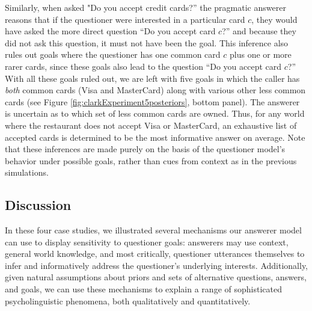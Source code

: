 \documentclass[12pt, floatsintext, jou]{apa6}
\begin{document}
Similarly, when asked "Do you accept credit cards?'' the pragmatic answerer reasons that if the questioner were interested in a particular card $c$, they would have asked the more direct question ``Do you accept card $c$?'' and because they did not ask this question, it must not have been the goal. This inference also rules out goals where the questioner has one common card $c$ plus one or more rarer cards, since these goals also lead to the question ``Do you accept card $c$?'' With all these goals ruled out, we are left with five goals in which the caller has \emph{both} common cards (Visa and MasterCard) along with various other less common cards (see Figure \ref{fig:clarkExperiment5posteriors}, bottom panel). The answerer is uncertain as to which set of less common cards are owned. Thus, for any world where the restaurant does not accept Visa or MasterCard, an exhaustive list of accepted cards is determined to be the most informative answer on average. Note that these inferences are made purely on the basis of the questioner model's behavior under possible goals, rather than cues from context as in the previous simulations.

\subsection{Discussion}

In these four case studies, we illustrated several mechanisms our answerer model can use to display sensitivity to questioner goals: answerers may use context, general world knowledge, and most critically, questioner utterances themselves to infer and informatively address the questioner's underlying interests. Additionally, given natural assumptions about priors and sets of alternative questions, answers, and goals, we can use these mechanisms to explain a range of sophisticated psycholinguistic phenomena, both qualitatively and quantitatively.

\end{document}
